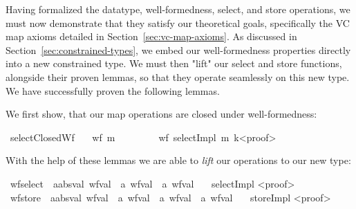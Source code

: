 Having formalized the datatype, well-formedness, select, and store operations, we must now demonstrate that they satisfy our theoretical goals, specifically the VC map axioms detailed in Section~\ref{sec:vc-map-axioms}.
As discussed in Section~\ref{sec:constrained-types}, we embed our well-formedness properties directly into a new constrained type.
We must then "lift" our select and store functions, alongside their proven lemmas, so that they operate seamlessly on this new type.
We have successfully proven the following lemmas.

We first show, that our map operations are closed under well-formedness:

\begin{isabellebody}\isanewline
{}\isamarkupfalse%
\ selectClosedWf{\isacharcolon}{\kern0pt}\isanewline
\ \ \ {\isachardoublequoteopen}wf\ m{\isachardoublequoteclose}\isanewline
\ \ \ %
\ %
\isanewline
\ \ \ {\isachardoublequoteopen}wf\ {\isacharparenleft}{\kern0pt}selectImpl\ m\ k{\isacharparenright}{\kern0pt}{\isachardoublequoteclose}\isanewline<proof>\isanewline
\end{isabellebody}

With the help of these lemmas we are able to \emph{lift} our operations to our new type:
\begin{isabellebody}\isanewline
\isamarkupfalse%
\ wf{\isacharunderscore}{\kern0pt}select\ {\isacharcolon}{\kern0pt}{\isacharcolon}{\kern0pt}\ {\isachardoublequoteopen}{\isacharprime}{\kern0pt}a{\isacharcolon}{\kern0pt}{\isacharcolon}{\kern0pt}absval\ wf{\isacharunderscore}{\kern0pt}val\ {\isasymRightarrow}\ {\isacharprime}{\kern0pt}a\ wf{\isacharunderscore}{\kern0pt}val\ {\isasymRightarrow}\ {\isacharprime}{\kern0pt}a\ wf{\isacharunderscore}{\kern0pt}val{\isachardoublequoteclose}\isanewline
\ \ \ selectImpl
\isanewline<proof>\isanewline\isanewline
\isamarkupfalse%
\ wf{\isacharunderscore}{\kern0pt}store\ {\isacharcolon}{\kern0pt}{\isacharcolon}{\kern0pt}\ {\isachardoublequoteopen}{\isacharprime}{\kern0pt}a{\isacharcolon}{\kern0pt}{\isacharcolon}{\kern0pt}absval\ wf{\isacharunderscore}{\kern0pt}val\ {\isasymRightarrow}\ {\isacharprime}{\kern0pt}a\ wf{\isacharunderscore}{\kern0pt}val\ {\isasymRightarrow}\ {\isacharprime}{\kern0pt}a\ wf{\isacharunderscore}{\kern0pt}val\ {\isasymRightarrow}\ {\isacharprime}{\kern0pt}a\ wf{\isacharunderscore}{\kern0pt}val{\isachardoublequoteclose}\isanewline
\ \ \ storeImpl
\isanewline<proof>\isanewline
\end{isabellebody}


